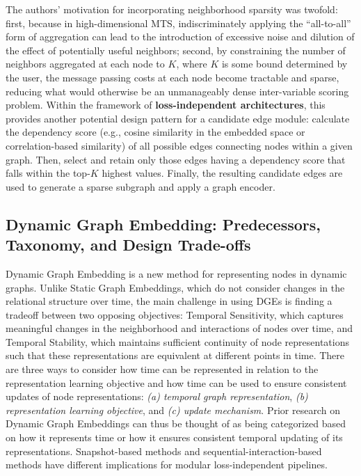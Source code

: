 The authors' motivation for incorporating neighborhood sparsity was twofold: first, because in high-dimensional MTS, indiscriminately applying the ``all-to-all'' form of aggregation can lead to the introduction of excessive noise and dilution of the effect of potentially useful neighbors; second, by constraining the number of neighbors aggregated at each node to $K$, where $K$ is some bound determined by the user, the message passing costs at each node become tractable and sparse, reducing what would otherwise be an unmanageably dense inter-variable scoring problem. Within the framework of \textbf{loss-independent architectures}, this provides another potential design pattern for a candidate edge module: calculate the dependency score (e.g., cosine similarity in the embedded space or correlation-based similarity) of all possible edges connecting nodes within a given graph. Then, select and retain only those edges having a dependency score that falls within the top-$K$ highest values. Finally, the resulting candidate edges are used to generate a sparse subgraph and apply a graph encoder.

\subsection{Dynamic Graph Embedding: Predecessors, Taxonomy, and Design Trade-offs}
\label{subsec:dynamic_embedding_predecessors_deep}

Dynamic Graph Embedding is a new method for representing nodes in dynamic graphs. Unlike Static Graph Embeddings, which do not consider changes in the relational structure over time, the main challenge in using DGEs is finding a tradeoff between two opposing objectives: Temporal Sensitivity, which captures meaningful changes in the neighborhood and interactions of nodes over time, and Temporal Stability, which maintains sufficient continuity of node representations such that these representations are equivalent at different points in time. There are three ways to consider how time can be represented in relation to the representation learning objective and how time can be used to ensure consistent updates of node representations: \emph{(a) temporal graph representation}, \emph{(b) representation learning objective}, and \emph{(c) update mechanism}. Prior research on Dynamic Graph Embeddings can thus be thought of as being categorized based on how it represents time or how it ensures consistent temporal updating of its representations. Snapshot-based methods and sequential-interaction-based methods have different implications for modular loss-independent pipelines.

